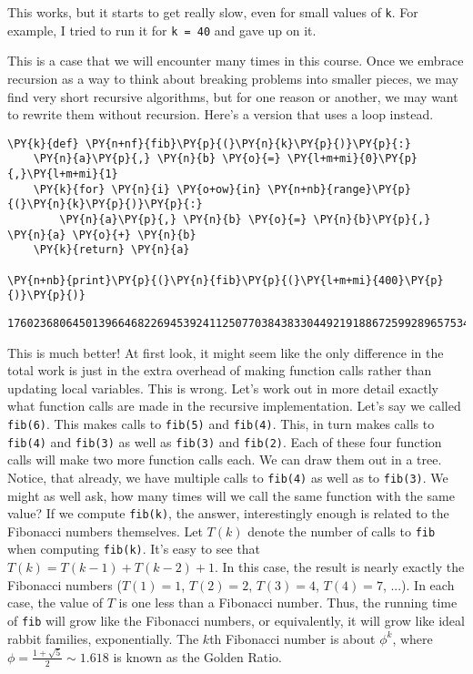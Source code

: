 This works, but it starts to get really slow, even for small values of \texttt{k}.
For example, I tried to run it for \texttt{k = 40} and gave up on it.


This is a case that we will encounter many times in this course.
Once we embrace recursion as a way to think about breaking problems into smaller pieces, we may find very short recursive algorithms, but for one reason or another, we may want to rewrite them without recursion.
Here's a version that uses a loop instead.


\begin{Verbatim}[commandchars=\\\{\}]
\PY{k}{def} \PY{n+nf}{fib}\PY{p}{(}\PY{n}{k}\PY{p}{)}\PY{p}{:}
    \PY{n}{a}\PY{p}{,} \PY{n}{b} \PY{o}{=} \PY{l+m+mi}{0}\PY{p}{,}\PY{l+m+mi}{1}
    \PY{k}{for} \PY{n}{i} \PY{o+ow}{in} \PY{n+nb}{range}\PY{p}{(}\PY{n}{k}\PY{p}{)}\PY{p}{:}
        \PY{n}{a}\PY{p}{,} \PY{n}{b} \PY{o}{=} \PY{n}{b}\PY{p}{,} \PY{n}{a} \PY{o}{+} \PY{n}{b}
    \PY{k}{return} \PY{n}{a}

\PY{n+nb}{print}\PY{p}{(}\PY{n}{fib}\PY{p}{(}\PY{l+m+mi}{400}\PY{p}{)}\PY{p}{)}
\end{Verbatim}

\begin{Verbatim}
176023680645013966468226945392411250770384383304492191886725992896575345044216019675
\end{Verbatim}


This is much better!
At first look, it might seem like the only difference in the total work is just in the extra overhead of making function calls rather than updating local variables.
This is wrong.
Let's work out in more detail exactly what function calls are made in the recursive implementation.
Let's say we called \texttt{fib(6)}.
This makes calls to \texttt{fib(5)} and \texttt{fib(4)}.
This, in turn makes calls to \texttt{fib(4)} and \texttt{fib(3)} as well as \texttt{fib(3)} and \texttt{fib(2)}.
Each of these four function calls will make two more function calls each.
We can draw them out in a tree.
Notice, that already, we have multiple calls to \texttt{fib(4)} as well as to \texttt{fib(3)}.
We might as well ask, how many times will we call the same function with the same value?
If we compute \texttt{fib(k)}, the answer, interestingly enough is related to the Fibonacci numbers themselves.
Let $T(k)$ denote the number of calls to \texttt{fib} when computing \texttt{fib(k)}.
It's easy to see that $T(k) = T(k-1) + T(k-2) + 1$.
In this case, the result is nearly exactly the Fibonacci numbers ($T(1) = 1$, $T(2) = 2$, $T(3) = 4$, $T(4) = 7$, ...).  In each case, the value of $T$ is one less than a Fibonacci number.  Thus, the running time of \texttt{fib} will grow like the Fibonacci numbers, or equivalently, it will grow like ideal rabbit families, exponentially.  The $k$th Fibonacci number is about $\phi^k$, where $\phi = \frac{1+\sqrt{5}}{2}\sim1.618$ is known as the Golden Ratio.


